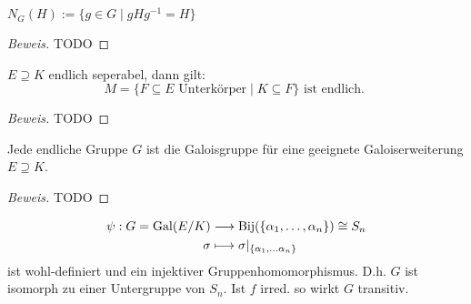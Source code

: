 \documentclass[a4paper]{report}
\begin{document}
\begin{whg*}
$N_{G}(H) := \{g \in G \mid gHg^{-1} = H\}$
\end{whg*}
\begin{proof}[Beweis]
TODO
\end{proof}
\begin{kor}
  $E \supseteq K$ endlich seperabel, dann gilt: \[M = \{F \subseteq E \text{ Unterkörper} \mid K \subseteq F\} \text{ ist endlich. }\]

\begin{proof}[Beweis]
TODO
\end{proof}
\end{kor}
\begin{satz}
  Jede endliche Gruppe $G$ ist die Galoisgruppe für eine geeignete Galoiserweiterung $E \supseteq K$.
\begin{proof}[Beweis]
TODO
\end{proof}
\end{satz}
\begin{bem}
                  \begin{align*}
                    \psi: G = \operatorname{Gal}(E/K) & \longrightarrow \operatorname{Bij}(\{\alpha_{1}, \ldots, \alpha_{n}\}) \cong S_{n}\\
                    \sigma & \longmapsto \sigma|_{\{\alpha_{1}, \ldots \alpha_{n}\}}
                  \end{align*}
                  ist wohl-definiert und ein injektiver Gruppenhomomorphismus. D.h. $G$ ist isomorph zu einer Untergruppe von $S_{n}$. Ist $f$ irred. so wirkt $G$ transitiv.
\end{bem}
\end{document}
